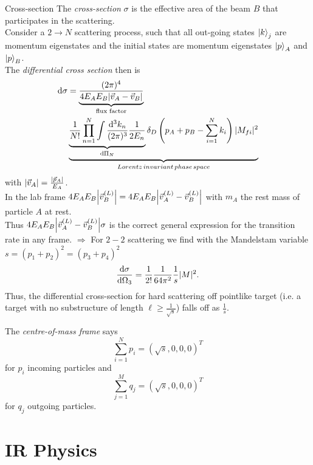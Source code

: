 \begin{mybox}{Cross-section}
	The \emph{cross-section} $\sigma$ is the effective area of the beam $B$ that participates in the scattering.\\
	Consider a $2 \rightarrow N$ scattering process, such that all out-going states $\ket{k}_j$ are momentum eigenstates and the initial states are momentum eigenstates $\ket{p}_A$ and $\ket{p}_B$.\\
	The \emph{differential cross section} then is
	\begin{align}
				\mathrm{d} \sigma &= \underbrace{\frac{(2 \pi)^4}{4 E_A E_B \abs{\vec{v}_A-\vec{v}_B}}}_{ \text{flux factor}}  \\\
				&\underbrace{\underbrace{ \frac{1}{N!} \prod_{n=1}^{N} \int \frac{\mathrm{d}^3 k_n}{(2 \pi)^3}\frac{1}{2 E_n}  	}_{\mathrm{d} \Pi_N} \delta_D \left(p_A+p_B-\sum_{i=1}^{N} k_i\right) |M_{fi}|^2}_{Lorentz\, invariant\, phase\,space} \nonumber 
	\end{align}
	with $\abs{\vec{v}_A} = \frac{\abs{\vec{p}_A}}{E_A}$.\\
	In the lab frame $4 E_A E_B \abs{\vec{v}^{(L)}_B} = 4 E_A E_B \abs{\vec{v}^{(L)}_A-\vec{v}^{(L)}_B}$ with $m_A$ the rest mass of particle $A$ at rest.\\
	Thus $4 E_A E_B \abs{\vec{v}^{(L)}_A - \vec{v}^{(L)}_B} \sigma$ is the correct general expression for the transition rate in any frame.
	$\Rightarrow$ For $2-2$ scattering we find with the Mandelstam variable $s =(p_1+p_2)^2 = (p_3+p_4)^2$ 
	\begin{equation}
			\frac{\mathrm{d} \sigma}{\mathrm{d} \Omega_3} = \frac{1}{2!} \frac{1}{64 \pi^2} \frac{1}{s} |M|^2.
	\end{equation}
	Thus, the differential cross-section for hard scattering off pointlike target (i.e. a target with no substructure of length $\ell \geq \frac{1}{\sqrt{s}}$) falls off as $\frac{1}{s}$.
\end{mybox}
The \emph{centre-of-mass frame} says
\begin{equation}
	\sum_{i=1}^{N} p_i = (\sqrt{s},0,0,0)^T
\end{equation}
for $p_i$ incoming particles and
\begin{equation}
	\sum_{j=1}^{M} q_j = (\sqrt{s},0,0,0)^T
\end{equation}
for $q_j$ outgoing particles.








\section{IR Physics}
